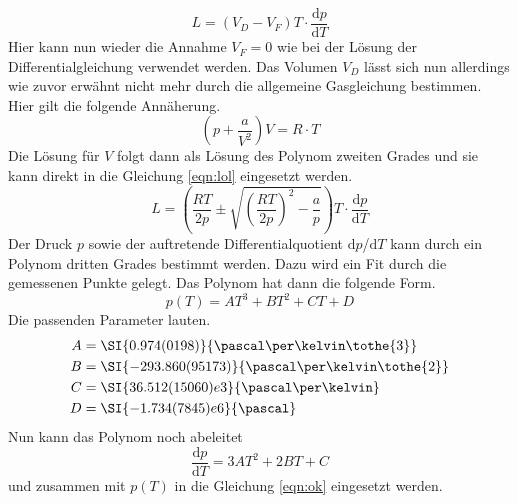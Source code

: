 \begin{equation}
    \label{eqn:lol}
L = (V_{D}-V_{F})T \cdot \frac{\text{d}p}{\text{d}T}
\end{equation}
Hier kann nun wieder die Annahme $V_{F} = 0$ wie bei der Lösung der Differentialgleichung verwendet werden. Das Volumen $V_{D}$ lässt sich nun allerdings wie zuvor erwähnt nicht mehr
durch die allgemeine Gasgleichung bestimmen. Hier gilt die folgende Annäherung.
\begin{equation}
\left( p + \frac{a}{V^{2}}\right)V = R \cdot T 
\end{equation}
Die Lösung für $V$ folgt dann als Lösung des Polynom zweiten Grades und sie kann direkt in die Gleichung \eqref{eqn:lol} eingesetzt werden.
\begin{equation}
    \label{eqn:ok}
L = \left(\frac{RT}{2p} \pm \sqrt{\left( \frac{RT}{2p}\right)^2 -\frac{a}{p}}\right) T \cdot \frac{\text{d}p}{\text{d}T}
\end{equation}
Der Druck $p$ sowie der auftretende Differentialquotient $\text{d}p$/$\text{d}T$ kann durch ein Polynom dritten Grades bestimmt werden. Dazu wird ein
Fit durch die gemessenen Punkte gelegt. Das Polynom hat dann die folgende Form.
\begin{equation}
p(T) = AT^{3} + BT^{2} + CT + D
\end{equation}
Die passenden Parameter lauten.
\begin{align*}
    A &= \SI{0.974(0198)}{\pascal\per\kelvin\tothe{3}} \\
    B &= \SI{-293.860(95173)}{\pascal\per\kelvin\tothe{2}} \\
    C &= \SI{36.512 (15060)e3}{\pascal\per\kelvin}\\
    D &=  \SI{-1.734 (7845)e6}{\pascal} \\
\end{align*}
Nun kann das Polynom noch abeleitet
\begin{equation}
\frac{\text{d}p}{\text{d}T} = 3AT^{2} + 2BT + C
\end{equation}
und zusammen mit $p(T)$ in die Gleichung \eqref{eqn:ok} eingesetzt werden.